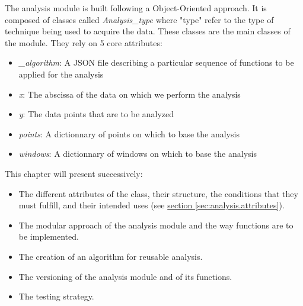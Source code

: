 The analysis module is built following a Object-Oriented approach. It is composed of classes called \textit{Analysis\_type} where "type" refer to the type of technique being used to acquire the data. These classes are the main classes of the module. They rely on 5 core attributes:
\begin{itemize}
    \item \textit{\_algorithm}: A JSON file describing a particular sequence of functions to be applied for the analysis
    \item \textit{x}: The abscissa of the data on which we perform the analysis
    \item \textit{y}: The data points that are to be analyzed
    \item \textit{points}: A dictionnary of points on which to base the analysis
    \item \textit{windows}: A dictionnary of windows on which to base the analysis
\end{itemize}

This chapter will present successively:
\begin{itemize}
    \item The different attributes of the class, their structure, the conditions that they must fulfill, and their intended uses (see \hyperref[sec:analysis.attributes]{section \ref{sec:analysis.attributes}}).
    \item The modular approach of the analysis module and the way functions are to be implemented. 
    \item The creation of an algorithm for reusable analysis.
    \item The versioning of the analysis module and of its functions.
    \item The testing strategy.
\end{itemize}


